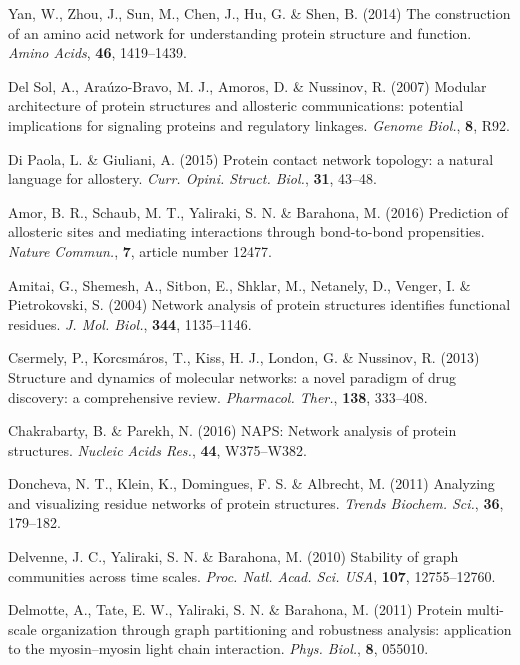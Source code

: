 \documentclass[a4paper,numbib, final, twoside, titelpage]{imaiai}%
\begin{document}
\begin{references}
{\sc Yan, W., Zhou, J., Sun, M., Chen, J., Hu, G. \& Shen, B.} (2014) The construction of an amino
  acid network for understanding protein structure and function. \textit{Amino Acids},
  {\bf 46}, 1419--1439.

{\sc Del Sol, A., Ara{\'u}zo-Bravo, M. J., Amoros, D. \& Nussinov, R.} (2007) Modular
  architecture of protein structures and allosteric communications: potential
  implications for signaling proteins and regulatory linkages. \textit{Genome Biol.},
  {\bf 8}, R92.

{\sc Di Paola, L. \& Giuliani, A.} (2015) Protein contact network topology: a natural language
  for allostery. \textit{Curr. Opini. Struct. Biol.}, {\bf 31}, 43--48.

{\sc Amor, B. R., Schaub, M. T., Yaliraki, S. N. \& Barahona, M.} (2016) Prediction of allosteric
  sites and mediating interactions through bond-to-bond propensities. \textit{Nature Commun.},
  \textbf{7}, article number 12477.

{\sc Amitai, G., Shemesh, A., Sitbon, E., Shklar, M., Netanely, D., Venger, I. \&
  Pietrokovski, S.} (2004) Network analysis of protein structures identifies functional
  residues. \textit{J. Mol. Biol.}, {\bf 344}, 1135--1146.

{\sc Csermely, P., Korcsm{\'a}ros, T., Kiss, H. J., London, G. \& Nussinov, R.} (2013) Structure
  and dynamics of molecular networks: a novel paradigm of drug discovery: a
  comprehensive review. \textit{Pharmacol. Ther.}, {\bf 138}, 333--408.

{\sc Chakrabarty, B. \& Parekh, N.} (2016) {NAPS}: Network analysis of protein structures.
  \textit{Nucleic Acids Res.}, {\bf 44}, W375--W382.

{\sc Doncheva, N. T., Klein, K., Domingues, F. S. \& Albrecht, M.} (2011) Analyzing and
  visualizing residue networks of protein structures. \textit{Trends Biochem.
  Sci.}, {\bf 36}, 179--182.

{\sc Delvenne, J. C., Yaliraki, S. N. \& Barahona, M.} (2010) Stability of graph communities
  across time scales. \textit{Proc. Natl. Acad. Sci. USA}, {\bf 107}, 12755--12760.

{\sc Delmotte, A., Tate, E. W., Yaliraki, S. N. \& Barahona, M.} (2011) Protein multi-scale
  organization through graph partitioning and robustness analysis: application
  to the myosin--myosin light chain interaction. \textit{Phys. Biol.}, {\bf 8}, 055010.


\end{references}
\end{document}
